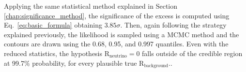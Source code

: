 Applying the same statistical method explained in Section \ref{chap:significance_method}, the significance of the excess is computed using Eq.~\ref{eq:basic_formula} obtaining $3.85\sigma$. 
Then, again following the strategy explained previously, the likelihood is sampled using a MCMC method and the contours are drawn using the 0.68, 0.95, and 0.997 quantiles. Even with the reduced statistics, the hypothesis \(\text{R}_{\text{neutrino}}=0\) falls outside of the credible region at 99.7\% probability, for every plausible true \(\text{R}_{\text{background}}\).. 


\clearpage
